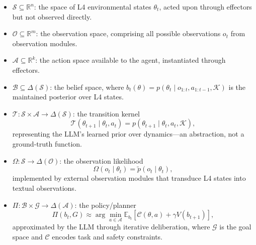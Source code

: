 \begin{itemize}
\item \(\mathcal{S} \subseteq \mathbb{R}^n\): the space of L4 environmental states \(\theta_t\), acted upon through effectors but not observed directly.

\item \(\mathcal{O} \subseteq \mathbb{R}^m\): the observation space, comprising all possible observations \(o_t\) from observation modules.

\item \(\mathcal{A} \subseteq \mathbb{R}^k\): the action space available to the agent, instantiated through effectors.

\item \(\mathcal{B} \subseteq \Delta(\mathcal{S})\): the belief space, where \(b_t(\theta) = p(\theta_t \mid o_{1:t}, a_{1:t-1}, \mathcal{K})\) is the maintained posterior over L4 states.

\item \(\mathcal{T}: \mathcal{S} \times \mathcal{A} \to \Delta(\mathcal{S})\): the transition kernel
\begin{equation}
\mathcal{T}(\theta_{t+1} \mid \theta_t, a_t) = p(\theta_{t+1} \mid \theta_t, a_t, \mathcal{K}),
\end{equation}
representing the LLM's learned prior over dynamics---an abstraction, not a ground-truth function.

\item \(\Omega: \mathcal{S} \to \Delta(\mathcal{O})\): the observation likelihood
\begin{equation}
\Omega(o_t \mid \theta_t) = \tilde{p}(o_t \mid \theta_t),
\end{equation}
implemented by external observation modules that transduce L4 states into textual observations.

\item \(\Pi: \mathcal{B} \times \mathcal{G} \to \Delta(\mathcal{A})\): the policy/planner
\begin{equation}
\Pi(b_t, G) \approx \arg\min_{a \in \mathcal{A}} \mathbb{E}_{b_t}[\mathcal{C}(\theta, a) + \gamma V(b_{t+1})],
\end{equation}
approximated by the LLM through iterative deliberation, where \(\mathcal{G}\) is the goal space and \(\mathcal{C}\) encodes task and safety constraints.
\end{itemize}

